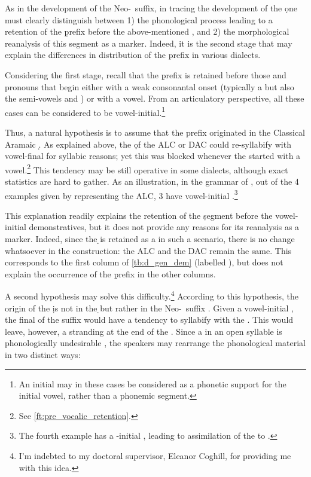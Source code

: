 As in the development of the Neo-\cst\ \ed suffix, in tracing the development of the  \d one must clearly distinguish between 1) the phonological process leading to a retention of the \d prefix before the above-mentioned , and 2) the morphological reanalysis of this segment as a \gen* marker. Indeed, it is the second stage that may explain the differences in distribution of the \gen* prefix in various  dialects.

Considering the first stage, recall that the \d prefix is retained before those  and pronouns that begin either with a weak consonantal onset (typically a   but also the semi-vowels  and ) or with a vowel. From an articulatory perspective, all these cases can be considered to be vowel-initial.\footnote{An initial  may in these cases be considered as a phonetic support for the initial vowel, rather than a phonemic segment.} 

Thus, a natural hypothesis is to assume that the \gen* prefix originated in the Classical Aramaic \lnk* \d. As explained above, the \lnk* \d of the ALC or DAC could re-syllabify with vowel-final \prims for syllabic reasons; yet this  was blocked whenever the \secn started with a vowel.\footnote{See \vref{ft:pre_vocalic_retention}.}  This tendency may be still operative in some  dialects, although exact statistics are hard to gather. As an illustration, in the grammar of \Amd, out of the 4 examples given by \citet[72]{GreenblattAmidya} representing the ALC, 3 have vowel-initial \secns.\footnote{The fourth example has a -initial \secn, leading to assimilation of the \lnk* to .}

This explanation readily explains the retention of the \d segment before the vowel-initial demonstratives, but it does not provide any reasons for its reanalysis as a \gen* marker. Indeed, since the \d \lnk* is retained as a  in such a scenario, there is no change whatsoever in the construction: the ALC and the DAC remain the same. This corresponds to the first column of \ref{tb:d_gen_dem} (labelled \free), but does not explain the occurrence of the \d prefix in the other columns.



A second hypothesis may solve this difficulty.\footnote{I'm indebted to my doctoral supervisor, Eleanor Coghill, for providing me with this idea.} According to this hypothesis, the origin of the \gen* \d is not in the \d \lnk* but rather in the Neo-\cst\ suffix \ed. Given a vowel-initial \secn, the final  of the \ed suffix would have a tendency to syllabify with the \secn. This would leave, however, a stranding  at the end of the \prim. Since a  in an open syllable is phonologically undesirable \citep[cf.][89]{CoghillAlqosh}, the speakers may rearrange the phonological material in two  distinct ways:

